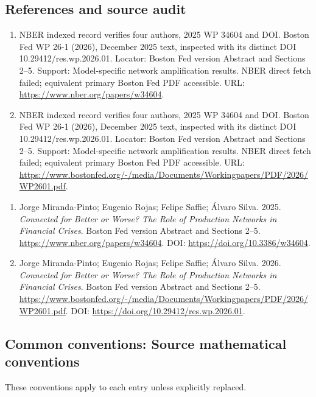 \documentclass[11pt,a4paper]{article}
\begin{document}
\subsection*{References and source audit}
\begin{enumerate}
\item NBER indexed record verifies four authors, 2025 WP 34604 and DOI. Boston Fed WP 26-1 (2026), December 2025 text, inspected with its distinct DOI 10.29412/res.wp.2026.01. Locator: Boston Fed version Abstract and Sections 2--5. Support: Model-specific network amplification results. NBER direct fetch failed; equivalent primary Boston Fed PDF accessible. URL: \url{https://www.nber.org/papers/w34604}.
\item NBER indexed record verifies four authors, 2025 WP 34604 and DOI. Boston Fed WP 26-1 (2026), December 2025 text, inspected with its distinct DOI 10.29412/res.wp.2026.01. Locator: Boston Fed version Abstract and Sections 2--5. Support: Model-specific network amplification results. NBER direct fetch failed; equivalent primary Boston Fed PDF accessible. URL: \url{https://www.bostonfed.org/-/media/Documents/Workingpapers/PDF/2026/WP2601.pdf}.
\end{enumerate}
\begin{enumerate}\raggedright
\item\hypertarget{definitions:source:30007618:1}{} Jorge Miranda-Pinto; Eugenio Rojas; Felipe Saffie; Álvaro Silva. 2025. \emph{Connected for Better or Worse? The Role of Production Networks in Financial Crises}. Boston Fed version Abstract and Sections 2--5.
\url{https://www.nber.org/papers/w34604}.
DOI: \url{https://doi.org/10.3386/w34604}.
\item\hypertarget{definitions:source:30007618:2}{} Jorge Miranda-Pinto; Eugenio Rojas; Felipe Saffie; Álvaro Silva. 2026. \emph{Connected for Better or Worse? The Role of Production Networks in Financial Crises}. Boston Fed version Abstract and Sections 2--5.
\url{https://www.bostonfed.org/-/media/Documents/Workingpapers/PDF/2026/WP2601.pdf}.
DOI: \url{https://doi.org/10.29412/res.wp.2026.01}.
\end{enumerate}

\subsection*{Common conventions: Source mathematical conventions}

These conventions apply to each entry unless explicitly replaced.
\end{document}
